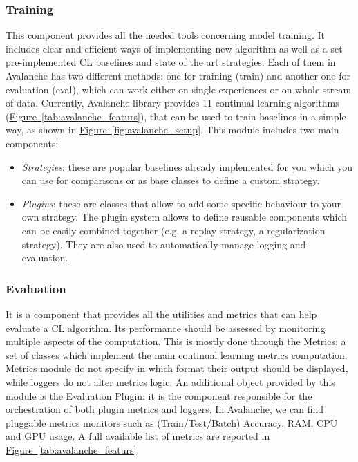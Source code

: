 \documentclass[english, LaM, oneside]{sapthesis}%
\begin{document}
\subsubsection{Training}
\textit{}This component provides all the needed tools concerning model training. It includes clear and efficient ways of implementing new algorithm as well as a set pre-implemented CL baselines and state of the art strategies. Each of them in Avalanche has two different methods: one for training (train) and another one for evaluation (eval), which can work either on single experiences or on whole stream of data. Currently, Avalanche library provides 11 continual learning algorithms (\hyperref[tab:avalanche_featurs]{Figure~\ref*{tab:avalanche_featurs}}), that can be used to train baselines in a simple way, as shown in \hyperref[fig:avalanche_setup]{Figure~\ref*{fig:avalanche_setup}}. This module includes two main components:
\begin{itemize}
    \item \textit{Strategies}: these are popular baselines already implemented for you which you can use for comparisons or as base classes to define a custom strategy.
    \item \textit{Plugins}: these are classes that allow to add some specific behaviour to your own strategy. The plugin system allows to define reusable components which can be easily combined together (e.g. a replay strategy, a regularization strategy). They are also used to automatically manage logging and evaluation.
\end{itemize}

\subsubsection{Evaluation}
It is a component that provides all the utilities and metrics that can help evaluate a CL algorithm. Its performance should be assessed by monitoring multiple aspects of the computation. This is mostly done through the Metrics: a set of classes which implement the main continual learning metrics computation. Metrics module do not specify in which format their output should be displayed, while loggers do not alter metrics logic. An additional object provided by this module is the Evaluation Plugin: it is the component responsible for the orchestration of both plugin metrics and loggers.
In Avalanche, we can find pluggable metrics monitors such as (Train/Test/Batch) Accuracy, RAM, CPU and GPU usage. A full available list of metrics are reported in \hyperref[tab:avalanche_featurs]{Figure~\ref*{tab:avalanche_featurs}}. 
\end{document}

